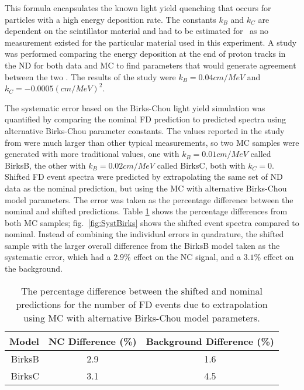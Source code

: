 \begin{doublespace}
\n This formula encapsulates the known light yield quenching that occurs for particles with a high energy deposition rate. The constants $k_B$ and $k_C$ are dependent on the scintillator material and had to be estimated for \nova~as no measurement existed for the particular material used in this experiment. A study was performed comparing the energy deposition at the end of proton tracks in the ND for both data and MC to find parameters that would generate agreement between the two \cite{ref:DanBirks}. The results of the study were $k_B = 0.04\unit{cm/MeV}$ and $k_C = -0.0005\unit{(cm/MeV)}^2$.

The systematic error based on the Birks-Chou light yield simulation was quantified by comparing the nominal FD prediction to predicted spectra using alternative Birks-Chou parameter constants. The values reported in the study from \cite{ref:DanBirks} were much larger than other typical measurements, so two MC samples were generated with more traditional values, one with $k_B = 0.01\unit{cm/MeV}$ called BirksB, the other with $k_B = 0.02\unit{cm/MeV}$ called BirksC, both with $k_C = 0$. Shifted FD event spectra were predicted by extrapolating the same set of ND data as the nominal prediction, but using the MC with alternative Birks-Chou model parameters. The error was taken as the percentage difference between the nominal and shifted predictions. Table \ref{tab:SystBirks} shows the percentage differences from both MC samples; fig.~\ref{fig:SystBirks} shows the shifted event spectra compared to nominal. Instead of combining the individual errors in quadrature, the shifted sample with the larger overall difference from the BirksB model taken as the systematic error, which had a $2.9\%$ effect on the NC signal, and a $3.1\%$ effect on the background.
\begin{table}[h]
  \begin{center}
    \caption[Birks-Chou Systematic Errors]{The percentage difference between the shifted and nominal predictions for the number of FD events due to extrapolation using MC with alternative Birks-Chou model parameters.}
    \label{tab:SystBirks}
    \begin{tabular}{r c c}
      \hline\hline
      Model & NC Difference (\%) & Background Difference (\%) \\
      \hline
      BirksB & 2.9 & 1.6 \\
      BirksC & 3.1 & 4.5 \\
      \hline
    \end{tabular}
  \end{center}
\end{table}


\end{doublespace}
